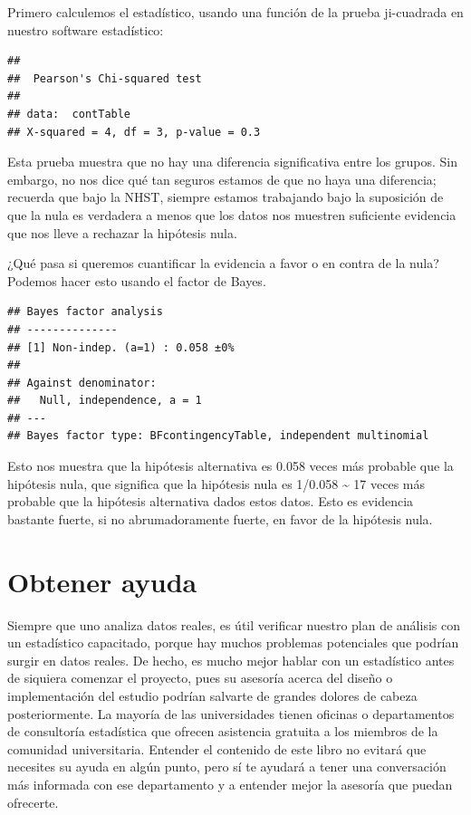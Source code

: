 \documentclass[
  12pt,
]{book}
\begin{document}
Primero calculemos el estadístico, usando una función de la prueba ji-cuadrada en nuestro software estadístico:

\begin{verbatim}
## 
## 	Pearson's Chi-squared test
## 
## data:  contTable
## X-squared = 4, df = 3, p-value = 0.3
\end{verbatim}

Esta prueba muestra que no hay una diferencia significativa entre los grupos. Sin embargo, no nos dice qué tan seguros estamos de que no haya una diferencia; recuerda que bajo la NHST, siempre estamos trabajando bajo la suposición de que la nula es verdadera a menos que los datos nos muestren suficiente evidencia que nos lleve a rechazar la hipótesis nula.

¿Qué pasa si queremos cuantificar la evidencia a favor o en contra de la nula? Podemos hacer esto usando el factor de Bayes.

\begin{verbatim}
## Bayes factor analysis
## --------------
## [1] Non-indep. (a=1) : 0.058 ±0%
## 
## Against denominator:
##   Null, independence, a = 1 
## ---
## Bayes factor type: BFcontingencyTable, independent multinomial
\end{verbatim}

Esto nos muestra que la hipótesis alternativa es 0.058 veces más probable que la hipótesis nula, que significa que la hipótesis nula es 1/0.058 \textasciitilde{} 17 veces más probable que la hipótesis alternativa dados estos datos. Esto es evidencia bastante fuerte, si no abrumadoramente fuerte, en favor de la hipótesis nula.

\hypertarget{obtener-ayuda}{%
\section{Obtener ayuda}\label{obtener-ayuda}}

Siempre que uno analiza datos reales, es útil verificar nuestro plan de análisis con un estadístico capacitado, porque hay muchos problemas potenciales que podrían surgir en datos reales. De hecho, es mucho mejor hablar con un estadístico antes de siquiera comenzar el proyecto, pues su asesoría acerca del diseño o implementación del estudio podrían salvarte de grandes dolores de cabeza posteriormente. La mayoría de las universidades tienen oficinas o departamentos de consultoría estadística que ofrecen asistencia gratuita a los miembros de la comunidad universitaria. Entender el contenido de este libro no evitará que necesites su ayuda en algún punto, pero sí te ayudará a tener una conversación más informada con ese departamento y a entender mejor la asesoría que puedan ofrecerte.
\end{document}
